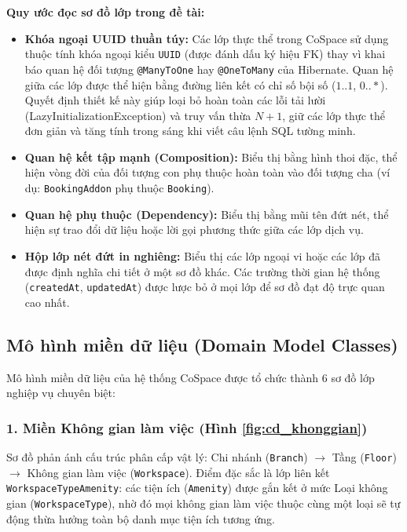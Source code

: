 \noindent\textbf{Quy ước đọc sơ đồ lớp trong đề tài:}
\begin{itemize}
    \item \textbf{Khóa ngoại UUID thuần túy:} Các lớp thực thể trong CoSpace sử dụng thuộc tính khóa ngoại kiểu \texttt{UUID} (được đánh dấu ký hiệu \guillemotleft FK\guillemotright) thay vì khai báo quan hệ đối tượng \texttt{@ManyToOne} hay \texttt{@OneToMany} của Hibernate. Quan hệ giữa các lớp được thể hiện bằng đường liên kết có chỉ số bội số ($1..1$, $0..*$). Quyết định thiết kế này giúp loại bỏ hoàn toàn các lỗi tải lười (LazyInitializationException) và truy vấn thừa $N+1$, giữ các lớp thực thể đơn giản và tăng tính trong sáng khi viết câu lệnh SQL tường minh.
    \item \textbf{Quan hệ kết tập mạnh (Composition):} Biểu thị bằng hình thoi đặc, thể hiện vòng đời của đối tượng con phụ thuộc hoàn toàn vào đối tượng cha (ví dụ: \texttt{BookingAddon} phụ thuộc \texttt{Booking}).
    \item \textbf{Quan hệ phụ thuộc (Dependency):} Biểu thị bằng mũi tên đứt nét, thể hiện sự trao đổi dữ liệu hoặc lời gọi phương thức giữa các lớp dịch vụ.
    \item \textbf{Hộp lớp nét đứt in nghiêng:} Biểu thị các lớp ngoại vi hoặc các lớp đã được định nghĩa chi tiết ở một sơ đồ khác. Các trường thời gian hệ thống (\texttt{createdAt}, \texttt{updatedAt}) được lược bỏ ở mọi lớp để sơ đồ đạt độ trực quan cao nhất.
\end{itemize}

\subsection{Mô hình miền dữ liệu (Domain Model Classes)}
\label{ssec:lop_mien}

Mô hình miền dữ liệu của hệ thống CoSpace được tổ chức thành 6 sơ đồ lớp nghiệp vụ chuyên biệt:

\subsubsection{1. Miền Không gian làm việc (Hình \ref{fig:cd_khonggian})}
Sơ đồ phản ánh cấu trúc phân cấp vật lý: Chi nhánh (\texttt{Branch}) $\rightarrow$ Tầng (\texttt{Floor}) $\rightarrow$ Không gian làm việc (\texttt{Workspace}). Điểm đặc sắc là lớp liên kết \texttt{WorkspaceTypeAmenity}: các tiện ích (\texttt{Amenity}) được gắn kết ở mức Loại không gian (\texttt{WorkspaceType}), nhờ đó mọi không gian làm việc thuộc cùng một loại sẽ tự động thừa hưởng toàn bộ danh mục tiện ích tương ứng.

